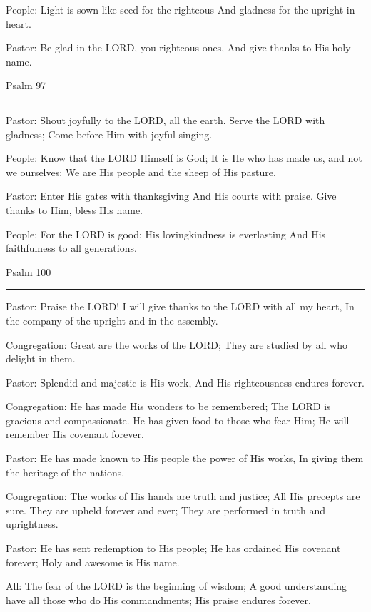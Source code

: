 \documentclass[]{book}
\begin{document}
People: Light is sown like seed for the righteous And gladness for the
upright in heart.

Pastor: Be glad in the LORD, you righteous ones, And give thanks to His
holy name.

Psalm 97 \textbar{}

\begin{center}\rule{0.5\linewidth}{\linethickness}\end{center}

Pastor: Shout joyfully to the LORD, all the earth. Serve the LORD with
gladness; Come before Him with joyful singing.

People: Know that the LORD Himself is God; It is He who has made us, and
not we ourselves; We are His people and the sheep of His pasture.

Pastor: Enter His gates with thanksgiving And His courts with praise.
Give thanks to Him, bless His name.

People: For the LORD is good; His lovingkindness is everlasting And His
faithfulness to all generations.

Psalm 100 \textbar{}

\begin{center}\rule{0.5\linewidth}{\linethickness}\end{center}

Pastor: Praise the LORD! I will give thanks to the LORD with all my
heart, In the company of the upright and in the assembly.

Congregation: Great are the works of the LORD; They are studied by all
who delight in them.

Pastor: Splendid and majestic is His work, And His righteousness endures
forever.

Congregation: He has made His wonders to be remembered; The LORD is
gracious and compassionate. He has given food to those who fear Him; He
will remember His covenant forever.

Pastor: He has made known to His people the power of His works, In
giving them the heritage of the nations.

Congregation: The works of His hands are truth and justice; All His
precepts are sure. They are upheld forever and ever; They are performed
in truth and uprightness.

Pastor: He has sent redemption to His people; He has ordained His
covenant forever; Holy and awesome is His name.

All: The fear of the LORD is the beginning of wisdom; A good
understanding have all those who do His commandments; His praise endures
forever.
\end{document}
